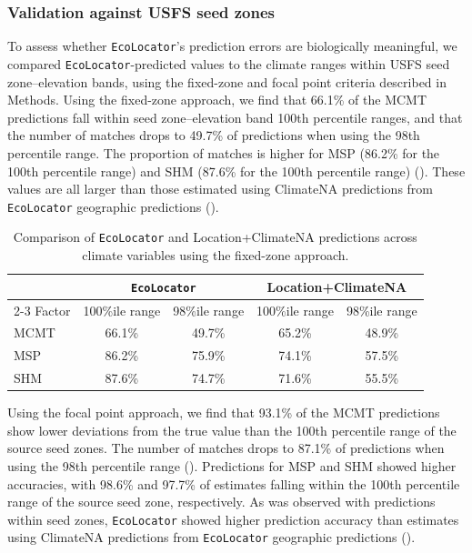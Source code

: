 \documentclass[]{article}
\newcommand{\ecolocator}{\texttt{EcoLocator}\xspace}
\begin{document}
\subsubsection*{Validation against USFS seed zones}

To assess whether \ecolocator's prediction errors
are biologically meaningful,
we compared \ecolocator-predicted values to the climate ranges
within USFS seed zone--elevation bands,
using the fixed-zone and focal point criteria described in Methods.
Using the fixed-zone approach, we find that 66.1\%
of the MCMT predictions fall within seed zone--elevation band 100th 
percentile ranges, and that the number of matches drops to 49.7\% of predictions when using the 
98th percentile range. The proportion of matches is higher for MSP (86.2\% for the 
100th percentile range) and SHM (87.6\% for the 100th percentile range) (). 
These values are all larger than those estimated using ClimateNA predictions from 
\ecolocator geographic predictions (). 

\begin{table}[ht]
  \centering
  \caption{Comparison of \ecolocator and Location+ClimateNA predictions across climate variables using the fixed-zone approach.} %
  \label{tab:table1}
  \begin{tabular}{lcccc}
  \hline
   & \multicolumn{2}{c}{\ecolocator} & \multicolumn{2}{c}{Location+ClimateNA} \\
  \cline{2-3} \cline{4-5}
  Factor & 100\%ile range & 98\%ile range & 100\%ile range & 98\%ile range \\
  \hline
  MCMT & 66.1\% & 49.7\% & 65.2\% & 48.9\% \\
  MSP  & 86.2\% & 75.9\% & 74.1\% & 57.5\% \\
  SHM  & 87.6\% & 74.7\% & 71.6\% & 55.5\% \\
\hline
\end{tabular}
\end{table}

Using the focal point approach, we find that 93.1\% of the MCMT predictions 
show lower deviations from the true value than the 100th percentile 
range of the source seed zones. The number of matches 
drops to 87.1\% of predictions when using the 98th percentile range 
(). Predictions for MSP and SHM showed higher accuracies,
with 98.6\% and 97.7\% of estimates falling within the 100th 
percentile range of the source seed zone, respectively. As was observed with 
predictions within seed zones, \ecolocator showed higher prediction 
accuracy than estimates using ClimateNA predictions from \ecolocator 
geographic predictions ().
\end{document}
